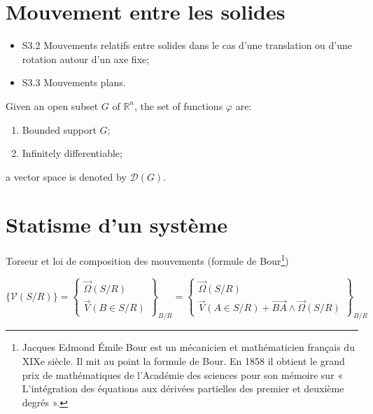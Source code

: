 \documentclass[
	11pt, %
	fleqn, %
	a4paper, %
]{LegrandOrangeBook}
\begin{document}

\section{Mouvement entre les solides}
\begin{corollary}[S3] 
\begin{itemize}
    \item S3.2 Mouvements relatifs entre solides dans le cas d'une translation ou d'une rotation autour d'un axe fixe;
    \item S3.3 Mouvements plans.
\end{itemize}

\end{corollary}



\begin{notation} %
	Given an open subset $G$ of $\mathbb{R}^n$, the set of functions $\varphi$ are:
	\begin{enumerate}
		\item Bounded support $G$;
		\item Infinitely differentiable;
	\end{enumerate}
	a vector space is denoted by $\mathcal{D}(G)$. 
\end{notation}


\section{Statisme d'un système}

Torseur et loi de composition des mouvements (formule de Bour\footnote{Jacques Edmond Émile Bour est un mécanicien et mathématicien français du XIXe siècle. Il mit au point la formule de Bour. En 1858 il obtient le grand prix de mathématiques de l’Académie des sciences pour son mémoire sur « L’intégration des équations aux dérivées partielles des premier et deuxième degrés ».})

$\{ \mathcal{V} (S/R) \}
= \left\{ \begin{array}{c}
     \overrightarrow{\Omega} (S/R) \\
     \overrightarrow{V} (B \in S/R)
\end{array} \right\} _{B/R}
= \left\{ \begin{array}{c}
     \overrightarrow{\Omega} (S/R) \\
     \overrightarrow{V} (A \in S/R) +\overrightarrow{BA} \wedge \overrightarrow{\Omega}(S/R)
\end{array} \right\} _{B/R}$
\end{document}
